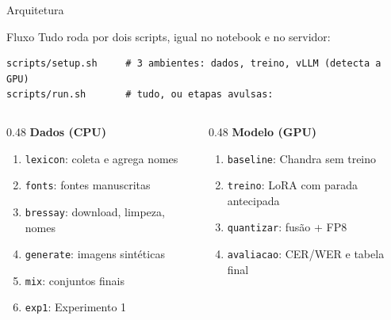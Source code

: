 \documentclass[aspectratio=169,11pt]{beamer}
\begin{document}
\begin{frame}{Arquitetura}
{}
\end{frame}

\begin{frame}[fragile]{Fluxo}
\small
Tudo roda por dois scripts, igual no notebook e no servidor:
\begin{verbatim}
scripts/setup.sh     # 3 ambientes: dados, treino, vLLM (detecta a GPU)
scripts/run.sh       # tudo, ou etapas avulsas:
\end{verbatim}
\vspace{-0.6em}
\begin{columns}[T]
\begin{column}{0.48\textwidth}
\textbf{Dados (CPU)}
\begin{enumerate}
  \item \texttt{lexicon}: coleta e agrega nomes
  \item \texttt{fonts}: fontes manuscritas
  \item \texttt{bressay}: download, limpeza, nomes
  \item \texttt{generate}: imagens sintéticas
  \item \texttt{mix}: conjuntos finais
  \item \texttt{exp1}: Experimento 1
\end{enumerate}
\end{column}
\begin{column}{0.48\textwidth}
\textbf{Modelo (GPU)}
\begin{enumerate}
  \item \texttt{baseline}: Chandra sem treino
  \item \texttt{treino}: LoRA com parada antecipada
  \item \texttt{quantizar}: fusão + FP8
  \item \texttt{avaliacao}: CER/WER e tabela final
\end{enumerate}
\end{column}
\end{columns}
\end{frame}
\end{document}
